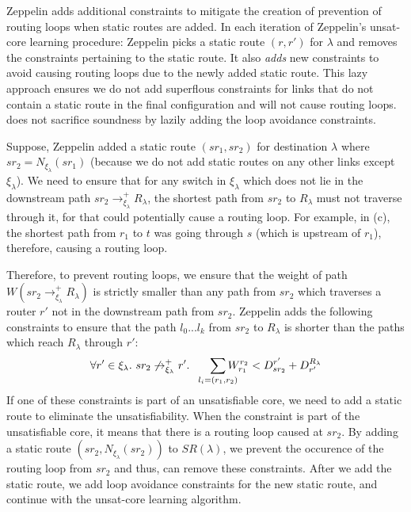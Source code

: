 Zeppelin adds additional constraints to mitigate the creation of prevention
of routing loops when static routes are added. In each iteration of
Zeppelin's unsat-core learning procedure: 
Zeppelin picks a static route $(r, r')$
for $\lambda$ and removes the constraints pertaining to 
the static route. It also \emph{adds} new constraints to avoid
causing routing loops due to the newly added static route. This
lazy approach ensures we do not add superflous constraints for links
that do not contain a static route in the final configuration 
and will not cause routing loops. \name does not sacrifice 
soundness by lazily adding the loop avoidance constraints. 

Suppose, Zeppelin added a static route $(sr_1, sr_2)$ for destination
$\lambda$ where $sr_2 = N_{\xi_\lambda}(sr_1)$ (because we do not add
static routes on any other links except $\xi_\lambda$). We need to
ensure that for any switch in $\xi_\lambda$ which does not 
lie in the downstream path $sr_2 \rightarrow^+_{\xi_\lambda} R_\lambda$, 
the shortest path from $sr_2$ to $R_\lambda$ must not traverse through 
it, for that could potentially cause a routing loop. For example, in (c), the shortest path from $r_1$ to $t$ was
going through $s$ (which is upstream of $r_1$), therefore, causing 
a routing loop. 

Therefore, to prevent routing loops, we ensure that the weight
of path $W(sr_2 \rightarrow^+_{\xi_\lambda} R_\lambda)$ is 
strictly smaller than any path from $sr_2$ which traverses a
router $r'$ not in the downstream path from $sr_2$. Zeppelin
adds the following constraints to ensure that the path $l_0...l_k$
from $sr_2$ to $R_\lambda$ is shorter than the paths which reach 
$R_\lambda$ through $r'$: 
\begin{equation}
\forall r' \in \xi_\lambda. ~sr_2 \not\rightarrow_{\xi_\lambda}^+ r'. 
~~~~~\sum_{\mathclap{\substack{l_i=(r_1,r_2)}}} 
W_{r_1}^{r_2} < D^{r'}_{sr_2} + D_{r'}^{R_\lambda} 
\end{equation}
If one of these constraints is part of an unsatisfiable
core, we need to add a static route to eliminate the 
unsatisfiability. When the constraint is part of the 
unsatisfiable core, it means that there is a routing 
loop caused at $sr_2$. By adding a static route 
$(sr_2, N_{\xi_\lambda}(sr_2))$ to $SR(\lambda)$, we prevent
the occurence of the routing loop from $sr_2$ and thus, can
remove these constraints. After we add the static route,
we add loop avoidance constraints for the new static
route, and continue with the unsat-core learning algorithm. 

